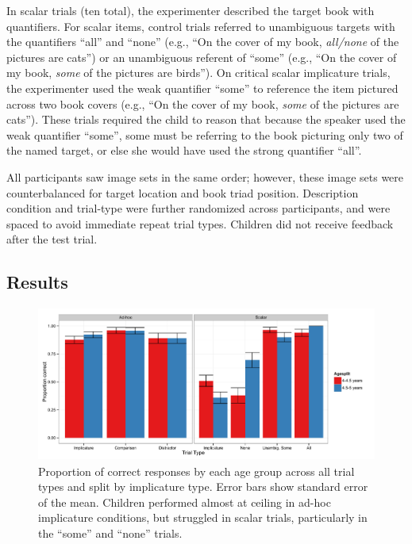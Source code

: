 \documentclass[man]{apa2}
\begin{document}
In scalar trials (ten total), the experimenter described the target book with quantifiers. For scalar items, control trials referred to unambiguous targets with the quantifiers ``all'' and ``none'' (e.g., ``On the cover of my book, \textit{all/none} of the pictures are cats'') or an unambiguous referent of ``some'' (e.g., ``On the cover of my book, \textit{some} of the pictures are birds''). On critical scalar implicature trials, the experimenter used the weak quantifier ``some'' to reference the item pictured across two book covers (e.g., ``On the cover of my book, \textit{some} of the pictures are cats''). These trials required the child to reason that because the speaker used the weak quantifier ``some'', some must be referring to the book picturing only two of the named target, or else she would have used the strong quantifier ``all''. 

All participants saw image sets in the same order; however, these image sets were counterbalanced for target location and book triad position. Description condition and trial-type were further randomized across participants, and were spaced to avoid immediate repeat trial types. Children did not receive feedback after the test trial.

\subsection{Results}


\begin{figure} 
 \begin{center} 
  \includegraphics[height=2in]{figures/exp1_performance.pdf} 
  \caption{\label{fig:exp1_perf} Proportion of correct responses by each age group across all trial types and split by implicature type. Error bars show standard error of the mean. Children performed almost at ceiling in ad-hoc implicature conditions, but struggled in scalar trials, particularly in the ``some'' and ``none'' trials.} 
 \end{center} 
\end{figure}
\end{document}
